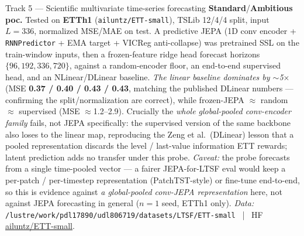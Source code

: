 \documentclass{article}
\newcommand{\code}[1]{\texttt{\small #1}}
\newcommand{\diffmed}{\colorbox{ebamber!18}{\textcolor{ebamber}{\small\bfseries Standard}}}
\newcommand{\diffhard}{\colorbox{ebred!15}{\textcolor{ebred}{\small\bfseries Ambitious}}}
\begin{document}
\begin{trackbox}{Track 5 --- Scientific multivariate time-series forecasting \hfill \diffmed{}/\diffhard{}}
\smallskip
\textbf{poc.} Tested on \textbf{ETTh1} (\code{ailuntz/ETT-small}), TSLib 12/4/4 split,
input $L=336$, normalized MSE/MAE on test. A predictive JEPA (1D conv encoder +
\code{RNNPredictor} + EMA target + VICReg anti-collapse) was pretrained SSL on the
train-window inputs, then a frozen-feature ridge head forecast horizons
$\{96,192,336,720\}$, against a random-encoder floor, an end-to-end supervised head,
and an NLinear/DLinear baseline. \emph{The linear baseline dominates by $\sim$5$\times$}
(MSE \textbf{0.37 / 0.40 / 0.43 / 0.43}, matching the published DLinear numbers ---
confirming the split/normalization are correct), while frozen-JEPA $\approx$ random
$\approx$ supervised (MSE $\approx$1.2--2.9). Crucially the \emph{whole global-pooled
conv-encoder family} fails, not JEPA specifically: the supervised version of the same
backbone also loses to the linear map, reproducing the Zeng et al.\ (DLinear) lesson
that a pooled representation discards the level / last-value information ETT rewards;
latent prediction adds no transfer under this probe. \emph{Caveat:} the probe forecasts
from a single time-pooled vector --- a fairer JEPA-for-LTSF eval would keep a
per-patch / per-timestep representation (PatchTST-style) or fine-tune end-to-end, so this
is evidence against \emph{a global-pooled conv-JEPA representation} here, not against JEPA
forecasting in general ($n{=}1$ seed, ETTh1 only).
\emph{Data:} \code{/lustre/work/pdl17890/udl806719/datasets/LTSF/ETT-small}
~|~ HF \href{https://huggingface.co/datasets/ailuntz/ETT-small}{ailuntz/ETT-small}.
\end{trackbox}
\end{document}
